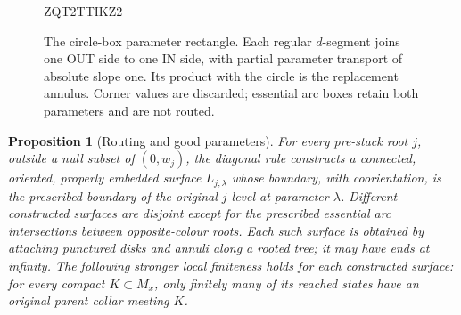 \documentclass[11pt]{article}
\numberwithin{equation}{section}
\newtheorem{proposition}[theorem]{Proposition}
\theoremstyle{definition}
\theoremstyle{remark}
\begin{document}
\begin{figure}[htbp]

ZQT2TTIKZ2
\caption{The circle-box parameter rectangle.  Each regular $d$-segment
joins one OUT side to one IN side, with partial parameter transport of
absolute slope one.  Its product with the circle is the replacement
annulus.  Corner values are discarded; essential arc boxes retain both
parameters and are not routed.}
\label{wl:routing-figure}
\end{figure}


\begin{proposition}[Routing and good parameters]
\label{wl:routing}
For every pre-stack root $j$, outside a null subset of $(0,w_j)$, the diagonal
rule constructs a connected, oriented, properly embedded surface
$L_{j,\lambda}$ whose boundary, with coorientation, is the prescribed boundary
of the original $j$-level at parameter $\lambda$.  Different constructed
surfaces are disjoint except for the prescribed essential arc intersections
between opposite-colour roots.  Each such surface is obtained by attaching
punctured disks and annuli along a rooted tree; it may have ends at infinity.
The following stronger local finiteness holds for each constructed surface:
for every compact $K\subset M_x$, only finitely many of its reached states
have an original parent collar meeting $K$.
\end{proposition}
\end{document}
